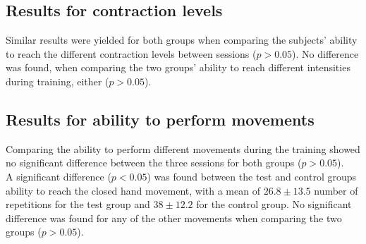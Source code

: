 \subsection{Results for contraction levels}
Similar results were yielded for both groups when comparing the subjects' ability to reach the different contraction levels between sessions ($p > 0.05$). No difference was found, when comparing the two groups' ability to reach different intensities during training, either ($p > 0.05$).

\subsection{Results for ability to perform movements}
Comparing the ability to perform different movements during the training showed no significant difference between the three sessions  for both groups ($p > 0.05$).\\  
A significant difference ($p < 0.05$) was found between the test and control groups ability to reach the closed hand movement, with a mean of $26.8 \pm13.5$ number of repetitions for the test group and $38 \pm12.2$ for the control group. No significant difference was found for any of the other movements when comparing the two groups ($p > 0.05$).
%
